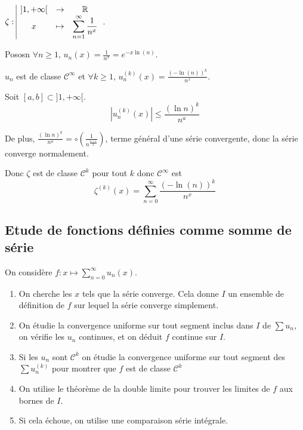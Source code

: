 \begin{exemple}
    $\zeta: \space \begin{array}{|ccc} \displaystyle ]1, + \infty[ & \to & \displaystyle \mathbb{R} \\ \displaystyle x & \mapsto & \displaystyle \sum_{n = 1}^{\infty} \frac 1 {n^x} \end{array}$.

    Pososn $\forall n \geqslant 1, \, u_n(x) = \frac 1 {n^x} = e^{-x \ln(n)}$.

    $u_n$ est de classe $\mathscr {C}^{\infty}$ et $\forall k \geqslant 1, \, u_n^{(k)}(x) = \frac{(- \ln(n))^k}{n^x}$. 

    Soit $[a, b] \subset ]1, +\infty[$.
    $$\left| u_n^{(k)}(x) \right| \leqslant \frac{(\ln n )^k}{n^a}$$

    De plus, $\displaystyle \frac{(\ln n)^k}{n^a} = \circ \left( \frac 1 {n^{\frac{a + 1}{2}}} \right)$, terme 
    général d'une série convergente, donc la série converge normalement. 

    Donc $\zeta$ est de classe $\mathscr{C}^{k}$ pour tout $k$ donc $\mathscr{C}^{\infty}$ est 
    $$\zeta^{(k)}(x) = \sum_{n = 0}^{\infty} \frac{(- \ln(n))^k}{n^x}$$
\end{exemple}

\subsection{Etude de fonctions définies comme somme de série }


On considère $f : \displaystyle x \mapsto \sum_{n = 0}^{\infty} u_n(x)$. 

\begin{enumerate}
    \item On cherche les $x$ tels que la série converge. Cela donne $I$ un ensemble de définition 
    de $f$ sur lequel la série converge simplement.
    \item On étudie la convergence uniforme sur tout segment inclus dans $I$ de $\sum u_n$, on vérifie 
    les $u_n$ continues, et on déduit $f$ continue sur $I$.
    \item Si les $u_n$ sont $\mathscr C^k$ on étudie la convergence uniforme sur tout segment des 
    $\sum u_n^{(k)}$ pour montrer que $f$ est de classe $\mathscr{C}^k$ 
    \item On utilise le théorème de la double limite pour trouver les limites de $f$ aux bornes 
    de $I$. 
    \item Si cela échoue, on utilise une comparaison série intégrale. 
\end{enumerate}

